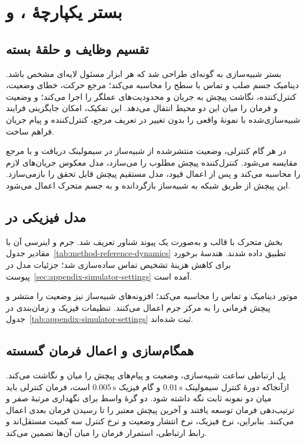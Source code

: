 \section{بستر یکپارچهٔ ،  و }
\label{sec:method-sim-env}

\subsection{تقسیم وظایف و حلقهٔ بسته}

بستر شبیه‌سازی به گونه‌ای طراحی شد که هر ابزار مسئول لایه‌ای مشخص باشد.  دینامیک جسم صلب و تماس با سطح را محاسبه می‌کند؛  مرجع حرکت، خطای وضعیت، کنترل‌کننده، نگاشت پیچش به جریان و محدودیت‌های عملگر را اجرا می‌کند؛ و  وضعیت و فرمان را میان این دو محیط انتقال می‌دهد. این تفکیک، امکان جایگزینی فرایند شبیه‌سازی‌شده با نمونهٔ واقعی را بدون تغییر در تعریف مرجع، کنترل‌کننده و پیام جریان فراهم ساخت.

در هر گام کنترلی، وضعیت منتشرشده از شبیه‌ساز در سیمولینک دریافت و با مرجع مقایسه می‌شود. کنترل‌کننده پیچش مطلوب را می‌سازد، مدل معکوس جریان‌های لازم را محاسبه می‌کند و پس از اعمال قیود، مدل مستقیم پیچش قابل تحقق را بازمی‌سازد. این پیچش از طریق شبکه به شبیه‌ساز بازگردانده و به جسم متحرک اعمال می‌شود.

\subsection{مدل فیزیکی در }
\label{subsec:method-urdf-model}

بخش متحرک با قالب  و به‌صورت یک پیوند شناور تعریف شد. جرم و اینرسی آن با مقادیر جدول~\ref{tab:method-reference-dynamics} تطبیق داده شدند. هندسهٔ برخورد برای کاهش هزینهٔ تشخیص تماس ساده‌سازی شد؛ جزئیات مدل در پیوست~\ref{sec:appendix-simulator-settings} آمده است.

موتور  دینامیک و تماس را محاسبه می‌کند؛ افزونه‌های شبیه‌ساز نیز وضعیت را منتشر و پیچش فرمانی را به مرکز جرم اعمال می‌کنند. تنظیمات فیزیک و زمان‌بندی در جدول~\ref{tab:appendix-simulator-settings} ثبت شده‌اند.

\subsection{همگام‌سازی و اعمال فرمان گسسته}
\label{subsec:method-ros-integration}

پل ارتباطی ساعت شبیه‌سازی، وضعیت و پیام‌های پیچش را میان  و  نگاشت می‌کند. ازآنجاکه دورهٔ کنترل سیمولینک $0.01\,\mathrm s$ و گام فیزیک $0.005\,\mathrm s$ است، فرمان کنترلی باید میان دو نمونه ثابت نگه داشته شود. دو گرهٔ واسط برای نگهداری مرتبهٔ صفر و ترتیب‌دهی فرمان توسعه یافتند و آخرین پیچش معتبر را تا رسیدن فرمان بعدی اعمال می‌کنند. بنابراین، نرخ فیزیک، نرخ انتشار وضعیت و نرخ کنترل سه کمیت مستقل‌اند و رابط ارتباطی، استمرار فرمان را میان آن‌ها تضمین می‌کند.

